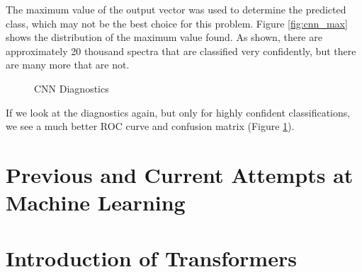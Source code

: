 The maximum value of the output vector was used to determine the predicted class,
which may not be the best choice for this problem. Figure \ref{fig:cnn_max} shows
the distribution of the maximum value found. As shown, there are approximately 
20 thousand spectra that are classified very confidently, but there are many
more that are not.
\begin{figure}[h]
    \centering
    \qquad
    \caption{CNN Diagnostics\label{fig:cnn_qual2}}
\end{figure} 
If we look at the diagnostics again, but only for highly confident classifications,
we see a much better ROC curve and confusion matrix (Figure \ref{fig:cnn_qual2}).



\section{Previous and Current Attempts at Machine Learning}
\label{sec:previousML}

\section{Introduction of Transformers}
\label{sec:transformers}


